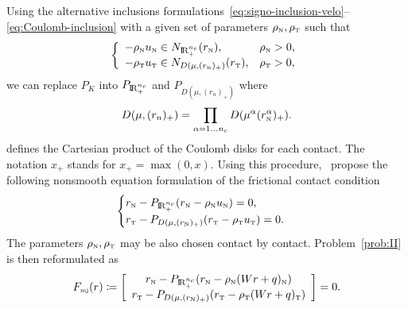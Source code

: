 {Using the alternative inclusions formulations~\eqref{eq:signo-inclusion-velo}--\eqref{eq:Coulomb-inclusion} with a given set of parameters $\rho_{\hbox{\tiny{N}}},\rho_{\hbox{\tiny{T}}}$ such that
\begin{equation} 
  \label{eq:inclusion-rhorho}
  \left\{ \begin{array}{ll}
    -\rho_\n u_\n \in N_{\RR^{n_c}_+}(r_\n), & \rho_\n>0, \\
    -\rho_\t u_{\t} \in N_{D(\mu,(r_{n})_+)}(r_\t), & \rho_\t>0,
  \end{array}\right.
\end{equation}
 we can replace $P_K$ into $P_{\mathrm{I\!R}^{n_c}_+}$ and $P_{D(\mu,(r_{n})_+)}$ where 
\begin{equation}
  \label{eq:diskR-prod}
  D(\mu,(r_{n})_+) = \prod_{\alpha=1\ldots n_c} D(\mu^{\alpha} (r_{\n}^\alpha)_+).
\end{equation}
defines the Cartesian product of the Coulomb disks for each contact. The notation $x_+$ stands for $x_+ = \max(0,x)$. Using this procedure,~\citet{Jean.Moreau1987,Christensen.Klarbring.ea1998} propose the following nonsmooth equation formulation of the frictional contact condition
\begin{equation}
  \label{eq:Moreau--Jean-1}
    \begin{cases}
    r_\n - P_{\RR^{n_c}_+}(r_\n - \rho_\n  u_\n) = 0, \\
    r_\t - P_{D(\mu, (r_{\n})_+)}(r_\t - \rho_\t u_\t   )=0.
  \end{cases}
\end{equation}
The parameters $\rho_{\hbox{\tiny{N}}},\rho_{\hbox{\tiny{T}}}$ may be also chosen contact by contact. Problem~\ref{prob:II} is then reformulated as
\begin{equation}
  \label{eq:MJ-II}
    F_{\mjtwo}(r) \coloneqq \left[ \begin{array}{c}
    r_\n - P_{\RR^{n_c}_+}(r_\n - \rho_\n (W r +  q)_\n) \\
    r_\t - P_{D(\mu, (r_{\n})_+)}(r_\t - \rho_\t (Wr+q)_\t   ) 
  \end{array}\right] =0.
\end{equation}

}
